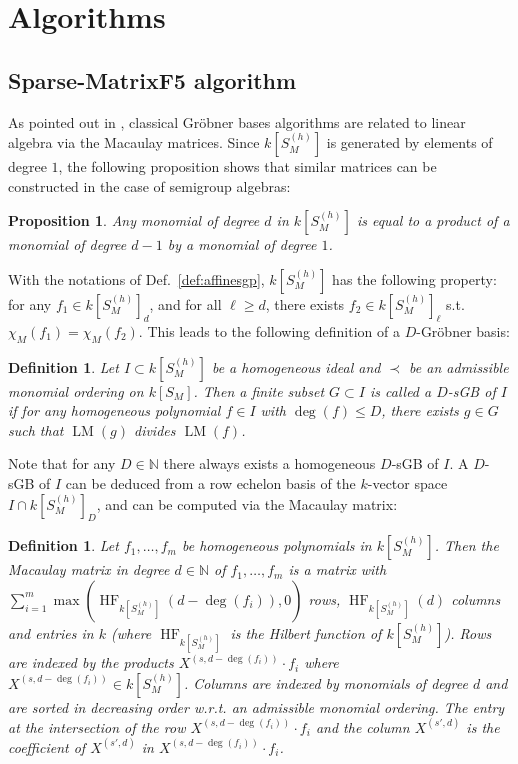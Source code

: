 \documentclass[12pt]{article}
\numberwithin{equation}{section}
\numberwithin{theorem}{section}
\newtheorem{proposition}[theorem]{Proposition}
\newtheorem{definition}[theorem]{Definition}
\DeclareMathOperator{\LM}{LM}
\DeclareMathOperator{\HF}{HF}
\newcommand{\sgp}{S}
\newcommand{\N}{\mathbb{N}}
\begin{document}
\section{Algorithms}\label{sec:algos}
\subsection{Sparse-MatrixF5 algorithm}
As pointed out in \cite{lazard1983grobner}, classical Gr\"obner bases algorithms are related to linear algebra via the Macaulay matrices.
Since $k[\sgp_M^{(h)}]$ is generated by elements of degree $1$, the following proposition shows that similar matrices can be constructed in the case of semigroup algebras:
\begin{proposition}
Any monomial of degree $d$ in $k[\sgp_M^{(h)}]$ is equal to a product
of a monomial of degree $d-1$ by a monomial of degree $1$.
\end{proposition}


With the notations of Def.~\ref{def:affinesgp}, $k[\sgp_M^{(h)}]$ has the following property: for any $f_1\in k[\sgp_M^{(h)}]_d$, and for all $\ell\geq d$, there exists $f_2\in k[\sgp_M^{(h)}]_\ell$ s.t. $\chi_M(f_1)=\chi_M(f_2)$. This leads to the following definition of a $D$-Gr\"obner basis:
\begin{definition}
  Let $I\subset k[\sgp_M^{(h)}]$ be a homogeneous ideal and $\prec$ be an admissible monomial ordering on $k[\sgp_M]$. Then a finite subset $G\subset I$ is called a $D$-sGB of $I$ if for any homogeneous polynomial $f\in I$ with $\deg(f)\leq D$, there exists $g\in G$ such that $\LM(g)$ divides $\LM(f)$.
\end{definition}
 Note that for any $D\in\N$ there always exists a homogeneous $D$-sGB of $I$. A $D$-sGB of $I$ can be deduced from a row echelon basis of the $k$-vector space $I\cap k[\sgp_M^{(h)}]_D$, and can be computed via the Macaulay matrix:
\begin{definition}
  Let $f_1,\ldots,f_m$ be homogeneous polynomials in $k[\sgp_M^{(h)}]$. Then the \emph{Macaulay matrix} in degree $d\in\N$ of $f_1,\ldots, f_m$ is a matrix with $\sum_{i=1}^m\max(\HF_{k[\sgp_M^{(h)}]}(d-\deg(f_i)),0)$ rows, $\HF_{k[\sgp_M^{(h)}]}(d)$ columns and entries in $k$ (where $\HF_{k[S_M^{(h)}]}$ is the Hilbert function of $k[S_M^{(h)}]$). Rows are indexed by the products $X^{(s,d-\deg(f_i))}\cdot f_i$ where $X^{(s,d-\deg(f_i))}\in k[\sgp_M^{(h)}]$. Columns are indexed by monomials of degree $d$ and are sorted in decreasing order w.r.t. an admissible monomial ordering. The entry at the intersection of the row $X^{(s,d-\deg(f_i))}\cdot f_i$ and the column $X^{(s',d)}$ is the coefficient of $X^{(s',d)}$ in $X^{(s,d-\deg(f_i))}\cdot f_i$.
\end{definition}
\end{document}
